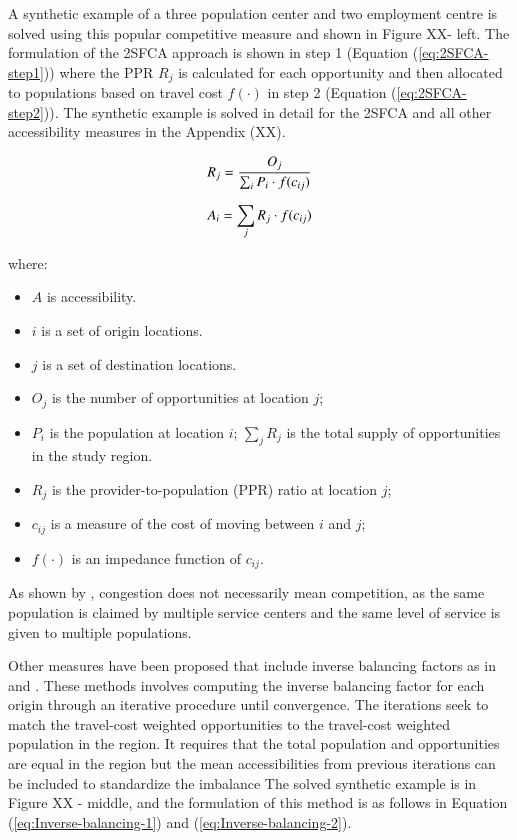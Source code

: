 \documentclass[]{elsarticle} %
\providecommand{\tightlist}{%
  \setlength{\itemsep}{0pt}\setlength{\parskip}{0pt}}
\begin{document}
A synthetic example of a three population center and two employment
centre is solved using this popular competitive measure and shown in
Figure XX- left. The formulation of the 2SFCA approach is shown in step
1 (Equation (\ref{eq:2SFCA-step1})) where the PPR \(R_j\) is calculated
for each opportunity and then allocated to populations based on travel
cost \(f(\cdot)\) in step 2 (Equation (\ref{eq:2SFCA-step2})). The
synthetic example is solved in detail for the 2SFCA and all other
accessibility measures in the Appendix (XX).

\begin{equation}
\label{eq:2SFCA-step1}
R_{j} = \frac{O_{j}}{\sum_i P_{i} \cdot f(c_{ij})}\\
\end{equation}

\begin{equation}
\label{eq:2SFCA-step2}
A_{i} = {\sum_j R_{j} \cdot f(c_{ij})}\\
\end{equation}

\noindent where:

\begin{itemize}
\tightlist
\item
  \(A\) is accessibility.
\item
  \(i\) is a set of origin locations.
\item
  \(j\) is a set of destination locations.
\item
  \(O_j\) is the number of opportunities at location \(j\);
\item
  \(P_i\) is the population at location \(i\); \(\sum_j R_j\) is the
  total supply of opportunities in the study region.
\item
  \(R_j\) is the provider-to-population (PPR) ratio at location \(j\);
\item
  \(c_{ij}\) is a measure of the cost of moving between \(i\) and \(j\);
\item
  \(f(\cdot)\) is an impedance function of \(c_{ij}\).
\end{itemize}

As shown by \citet{paez2019}, congestion does not necessarily mean
competition, as the same population is claimed by multiple service
centers and the same level of service is given to multiple populations.

Other measures have been proposed that include inverse balancing factors
as in \citep{horner_exploring_2004} and \citep{allen2019}. These methods
involves computing the inverse balancing factor for each origin through
an iterative procedure until convergence. The iterations seek to match
the travel-cost weighted opportunities to the travel-cost weighted
population in the region. It requires that the total population and
opportunities are equal in the region but the mean accessibilities from
previous iterations can be included to standardize the imbalance The
solved synthetic example is in Figure XX - middle, and the formulation
of this method is as follows in Equation (\ref{eq:Inverse-balancing-1})
and (\ref{eq:Inverse-balancing-2}).
\end{document}
